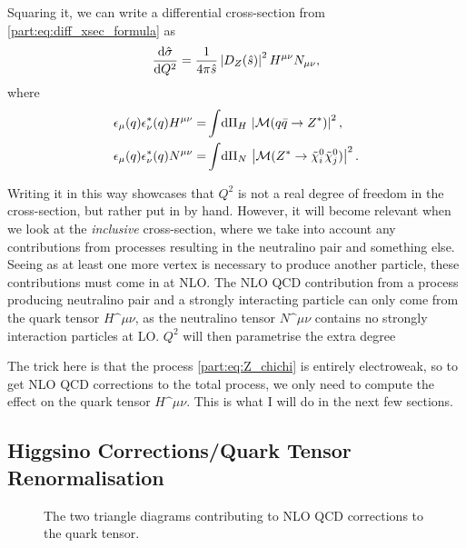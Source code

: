 \documentclass[../main.tex]{subfiles}
\begin{document}
Squaring it, we can write a differential cross-section from \cref{part:eq:diff_xsec_formula} as
\begin{align}
  \d[Q^2]{\hat\sigma} = \frac{1}{4\pi \hat{s}} \abs{D_Z(\hat{s})}^2 H^{\mu\nu}N_{\mu\nu},
\end{align}
where
\begin{subequations}
  \begin{align}
    \epsilon_{\mu}(q)\epsilon^\ast_{\nu}(q) H^{\mu\nu} = & \integral{\Pi_H} \abs{\M(q\bar{q} \to Z^\ast)}^2,          \\
    \epsilon_{\mu}(q)\epsilon^\ast_{\nu}(q) N^{\mu\nu} = & \integral{\Pi_N} \abs{\M(Z^\ast \to \nino[i] \nino[j])}^2.
  \end{align}
\end{subequations}

Writing it in this way showcases that \(Q^2\) is not a real degree of freedom in the cross-section, but rather put in by hand.
However, it will become relevant when we look at the \emph{inclusive} cross-section, where we take into account any contributions from processes resulting in the neutralino pair and something else.
Seeing as at least one more vertex is necessary to produce another particle, these contributions must come in at NLO.
The NLO QCD contribution from a process producing neutralino pair and a strongly interacting particle can only come from the quark tensor \(H\^{\mu\nu}\), as the neutralino tensor \(N\^{\mu\nu}\) contains no strongly interaction particles at LO.
\(Q^2\) will then parametrise the extra degree

The trick here is that the process \cref{part:eq:Z_chichi} is entirely electroweak, so to get NLO QCD corrections to the total process, we only need to compute the effect on the quark tensor \(H\^{\mu\nu}\).
This is what I will do in the next few sections.


\subsection{Higgsino Corrections/Quark Tensor Renormalisation}

\begin{figure}[ht!]
  \centering
  \begin{subfigure}{.49\textwidth}
    \centering
    \caption{}
    \label{part:subfig:gluon_triangle}
  \end{subfigure}
  \begin{subfigure}{.49\textwidth}
    \centering
    \caption{}
    \label{part:subfig:gluino_triangle}
  \end{subfigure}
  \caption{The two triangle diagrams contributing to NLO QCD corrections to the quark tensor.}
  \label{part:fig:NLO_triangles}
\end{figure}
\end{document}
